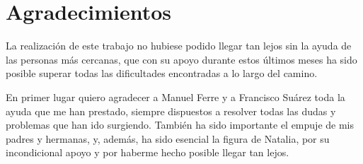 \chapter{Agradecimientos}

La realización de este trabajo no hubiese podido llegar tan lejos sin la ayuda de las personas más cercanas, que con su apoyo durante estos últimos meses ha sido posible superar todas las dificultades encontradas a lo largo del camino. \par 

En primer lugar quiero agradecer a Manuel Ferre y a Francisco Suárez toda la ayuda que me han prestado, siempre dispuestos a resolver todas las dudas y problemas que han ido surgiendo. También ha sido importante el empuje de mis padres y hermanas, y, además, ha sido esencial la figura de Natalia, por su incondicional apoyo y por haberme hecho posible llegar tan lejos. \par  